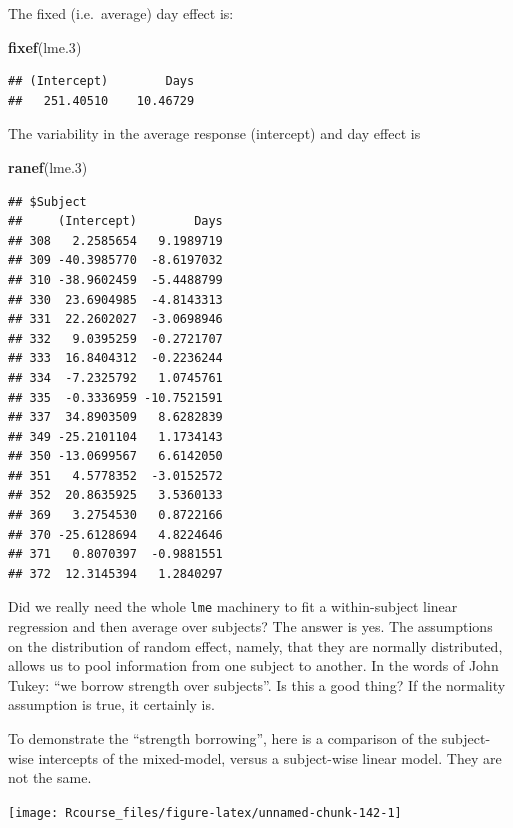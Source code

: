 \documentclass[]{book}
\newenvironment{Shaded}{\begin{snugshade}}{\end{snugshade}}
\newcommand{\KeywordTok}[1]{\textcolor[rgb]{0.13,0.29,0.53}{\textbf{{#1}}}}
\newcommand{\FloatTok}[1]{\textcolor[rgb]{0.00,0.00,0.81}{{#1}}}
\newcommand{\NormalTok}[1]{{#1}}
\theoremstyle{definition}
\theoremstyle{definition}
\theoremstyle{remark}
\begin{document}
The fixed (i.e.~average) day effect is:

\begin{Shaded}
\begin{Highlighting}[]
\KeywordTok{fixef}\NormalTok{(lme}\FloatTok{.3}\NormalTok{)}
\end{Highlighting}
\end{Shaded}

\begin{verbatim}
## (Intercept)        Days 
##   251.40510    10.46729
\end{verbatim}

The variability in the average response (intercept) and day effect is

\begin{Shaded}
\begin{Highlighting}[]
\KeywordTok{ranef}\NormalTok{(lme}\FloatTok{.3}\NormalTok{)}
\end{Highlighting}
\end{Shaded}

\begin{verbatim}
## $Subject
##     (Intercept)        Days
## 308   2.2585654   9.1989719
## 309 -40.3985770  -8.6197032
## 310 -38.9602459  -5.4488799
## 330  23.6904985  -4.8143313
## 331  22.2602027  -3.0698946
## 332   9.0395259  -0.2721707
## 333  16.8404312  -0.2236244
## 334  -7.2325792   1.0745761
## 335  -0.3336959 -10.7521591
## 337  34.8903509   8.6282839
## 349 -25.2101104   1.1734143
## 350 -13.0699567   6.6142050
## 351   4.5778352  -3.0152572
## 352  20.8635925   3.5360133
## 369   3.2754530   0.8722166
## 370 -25.6128694   4.8224646
## 371   0.8070397  -0.9881551
## 372  12.3145394   1.2840297
\end{verbatim}

Did we really need the whole \texttt{lme} machinery to fit a
within-subject linear regression and then average over subjects? The
answer is yes. The assumptions on the distribution of random effect,
namely, that they are normally distributed, allows us to pool
information from one subject to another. In the words of John Tukey:
``we borrow strength over subjects''. Is this a good thing? If the
normality assumption is true, it certainly is.

To demonstrate the ``strength borrowing'', here is a comparison of the
subject-wise intercepts of the mixed-model, versus a subject-wise linear
model. They are not the same.

\texttt{[image: Rcourse\_files/figure-latex/unnamed-chunk-142-1]}
\end{document}
